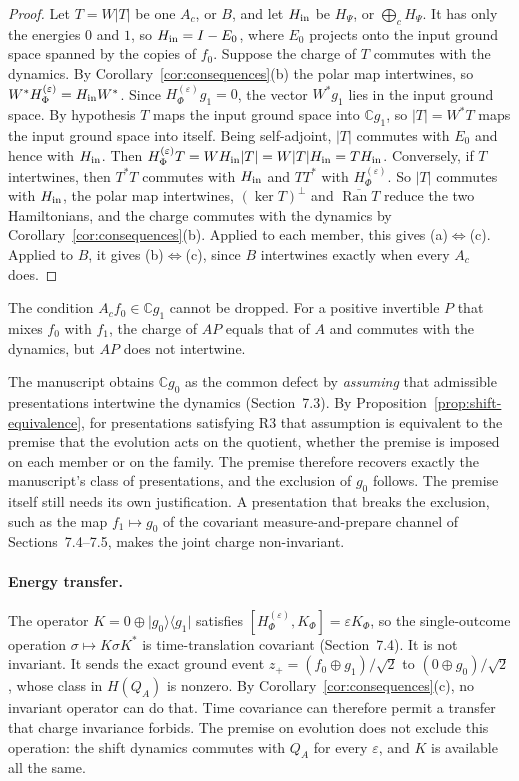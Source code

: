 \documentclass[11pt]{article}
\theoremstyle{remark}
\newcommand{\C}{\mathbb C}
\newcommand{\Ran}{\operatorname{Ran}}
\newcommand{\ket}[1]{\lvert #1\rangle}
\newcommand{\bra}[1]{\langle #1\rvert}
\begin{document}
\begin{proof}
Let $T=W|T|$ be one $A_c$, or $B$, and let $H_{\rm in}$ be $H_\Psi$, or $\bigoplus_cH_\Psi$. It has only the energies $0$ and $1$, so $H_{\rm in}=I-E_0$, where $E_0$ projects onto the input ground space spanned by the copies of $f_0$. Suppose the charge of $T$ commutes with the dynamics. By Corollary~\ref{cor:consequences}(b) the polar map intertwines, so $W^*H_\Phi^{(\varepsilon)}=H_{\rm in}W^*$. Since $H_\Phi^{(\varepsilon)}g_1=0$, the vector $W^*g_1$ lies in the input ground space. By hypothesis $T$ maps the input ground space into $\C g_1$, so $|T|=W^*T$ maps the input ground space into itself. Being self-adjoint, $|T|$ commutes with $E_0$ and hence with $H_{\rm in}$. Then $H_\Phi^{(\varepsilon)}T=WH_{\rm in}|T|=W|T|H_{\rm in}=TH_{\rm in}$. Conversely, if $T$ intertwines, then $T^*T$ commutes with $H_{\rm in}$ and $TT^*$ with $H_\Phi^{(\varepsilon)}$. So $|T|$ commutes with $H_{\rm in}$, the polar map intertwines, $(\ker T)^\perp$ and $\overline{\Ran T}$ reduce the two Hamiltonians, and the charge commutes with the dynamics by Corollary~\ref{cor:consequences}(b). Applied to each member, this gives (a)$\Leftrightarrow$(c). Applied to $B$, it gives (b)$\Leftrightarrow$(c), since $B$ intertwines exactly when every $A_c$ does.
\end{proof}

The condition $A_cf_0\in\C g_1$ cannot be dropped. For a positive invertible $P$ that mixes $f_0$ with $f_1$, the charge of $AP$ equals that of $A$ and commutes with the dynamics, but $AP$ does not intertwine.

The manuscript obtains $\C g_0$ as the common defect by \emph{assuming} that admissible presentations intertwine the dynamics (Section~7.3). By Proposition~\ref{prop:shift-equivalence}, for presentations satisfying R3 that assumption is equivalent to the premise that the evolution acts on the quotient, whether the premise is imposed on each member or on the family. The premise therefore recovers exactly the manuscript's class of presentations, and the exclusion of $g_0$ follows. The premise itself still needs its own justification. A presentation that breaks the exclusion, such as the map $f_1\mapsto g_0$ of the covariant measure-and-prepare channel of Sections~7.4--7.5, makes the joint charge non-invariant.

\paragraph{Energy transfer.} The operator $K=0\oplus\ket{g_0}\!\bra{g_1}$ satisfies $[H_\Phi^{(\varepsilon)},K_\Phi]=\varepsilon K_\Phi$, so the single-outcome operation $\sigma\mapsto K\sigma K^*$ is time-translation covariant (Section~7.4). It is not invariant. It sends the exact ground event $z_+=(f_0\oplus g_1)/\sqrt2$ to $(0\oplus g_0)/\sqrt2$, whose class in $H(Q_A)$ is nonzero. By Corollary~\ref{cor:consequences}(c), no invariant operator can do that. Time covariance can therefore permit a transfer that charge invariance forbids. The premise on evolution does not exclude this operation: the shift dynamics commutes with $Q_A$ for every $\varepsilon$, and $K$ is available all the same.
\end{document}
